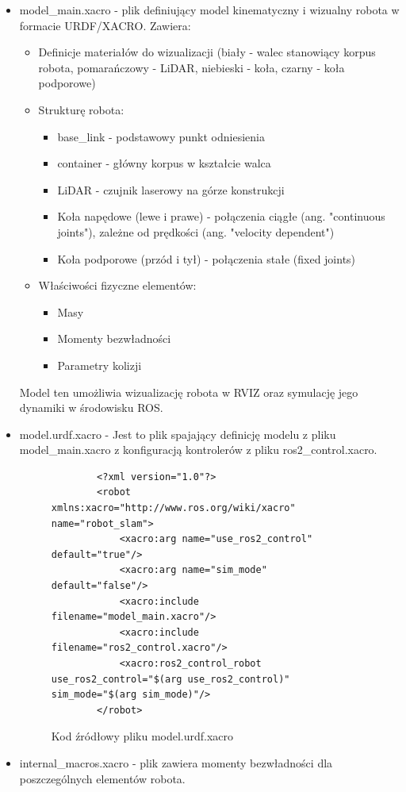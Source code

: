 \documentclass[a4paper,twoside,12pt]{book}
\begin{document}
\begin{itemize}
	\item model\_main.xacro - plik definiujący model kinematyczny i wizualny robota w formacie URDF/XACRO. Zawiera:
		\begin{itemize}
			\item Definicje materiałów do wizualizacji (biały - walec stanowiący korpus robota, pomarańczowy - LiDAR, niebieski - koła, czarny - koła podporowe)
			\item Strukturę robota:
			\begin{itemize}
				\item base\_link - podstawowy punkt odniesienia
				\item container - główny korpus w kształcie walca
				\item LiDAR - czujnik laserowy na górze konstrukcji
				\item Koła napędowe (lewe i prawe) - połączenia ciągłe (ang. "continuous joints"), zależne od prędkości (ang. "velocity dependent")
				\item Koła podporowe (przód i tył) - połączenia stałe (fixed joints)
			\end{itemize}
			\item Właściwości fizyczne elementów:
			\begin{itemize}
				\item Masy
				\item Momenty bezwładności
				\item Parametry kolizji
			\end{itemize}
		\end{itemize}
		Model ten umożliwia wizualizację robota w RVIZ oraz symulację jego dynamiki w środowisku ROS.
\newpage
	
	\item model.urdf.xacro - Jest to plik spajający definicję modelu z pliku model\_main.xacro z konfiguracją kontrolerów z pliku ros2\_control.xacro.
	
	\begin{figure}[!hb]
		\centering
	\begin{lstlisting}
		<?xml version="1.0"?>
		<robot xmlns:xacro="http://www.ros.org/wiki/xacro" name="robot_slam">
			<xacro:arg name="use_ros2_control" default="true"/>
			<xacro:arg name="sim_mode" default="false"/>
			<xacro:include filename="model_main.xacro"/>
			<xacro:include filename="ros2_control.xacro"/>
			<xacro:ros2_control_robot use_ros2_control="$(arg use_ros2_control)" sim_mode="$(arg sim_mode)"/>
		</robot>
		\end{lstlisting}
		\caption{Kod źródłowy pliku model.urdf.xacro}
		\label{fig:model.urdf.xacro}
	\end{figure}
	\item internal\_macros.xacro - plik zawiera momenty bezwładności dla poszczególnych elementów robota.


\end{itemize}
\end{document}
